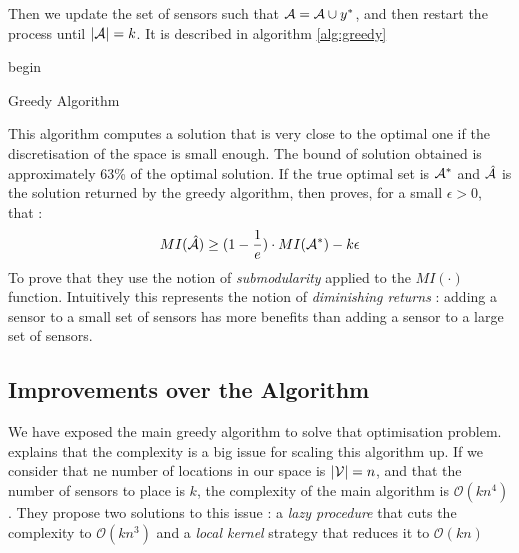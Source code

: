 \documentclass[12pt,twoside]{report}
\begin{document}
Then we update the set of sensors such that $\mathcal{A} = \mathcal{A} \cup y^*$, and then restart the process until $|\mathcal{A}| = k$. It is described in algorithm \ref{alg:greedy}  \\

\begin{algorithm}[h]
 begin\;
 \caption{Greedy Algorithm}
 \label{alg:greedy}
\end{algorithm}


This algorithm computes a solution that is very close to the optimal one if the discretisation of the space is small enough. The bound of solution obtained is approximately 63\% of the optimal solution. If the true optimal set is $\mathcal{A}^*$ and $\hat{\mathcal{A}}$ is the solution returned by the greedy algorithm, then \citet{krause_near-optimal_2008} proves, for a small $\epsilon >0 $, that : 
 \begin{equation}
	MI(\hat{\mathcal{A}}) \geq (1 - \frac{1}{e}) \cdot MI(\mathcal{A}^*) - k\epsilon
\end{equation}
To prove that they use the notion of \textit{submodularity} \citep{nemhauser_analysis_1978} applied to the $MI(\cdot)$ function. Intuitively this represents the notion of \textit{diminishing returns} :  adding a sensor to a small set of sensors has more benefits than adding a sensor to a large set of sensors. 


\subsection{Improvements over the Algorithm}



We have exposed the main greedy algorithm to solve that optimisation problem. \citet{krause_near-optimal_2008} explains that the complexity is a big issue for scaling this algorithm up. If we consider that ne number of locations in our space is $|\mathcal{V}| = n$, and that the number of sensors to place is $k$, the complexity of the main algorithm is $\mathcal{O}(kn^4)$. They propose two solutions to this issue : a \textit{lazy procedure} that cuts the complexity to  $\mathcal{O}(kn^3)$ and a \textit{local kernel} strategy that reduces it to $\mathcal{O}(kn)$
\end{document}
